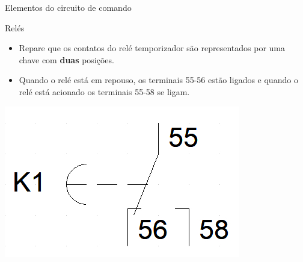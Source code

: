 \begin{frame}{Elementos do circuito de comando}
\begin{block}{Relés}
	\begin{itemize}
		\item Repare que os contatos do relé temporizador são representados por uma chave com \textbf{duas} posições.
		\item Quando o relé está em repouso, os terminais 55-56 estão ligados e quando o relé está acionado os terminais 55-58 se ligam.
	\end{itemize}
\end{block}
\centerline{\includegraphics[width=0.6\linewidth]{Figuras/Ch06/fig14.jpg}}
\end{frame}


